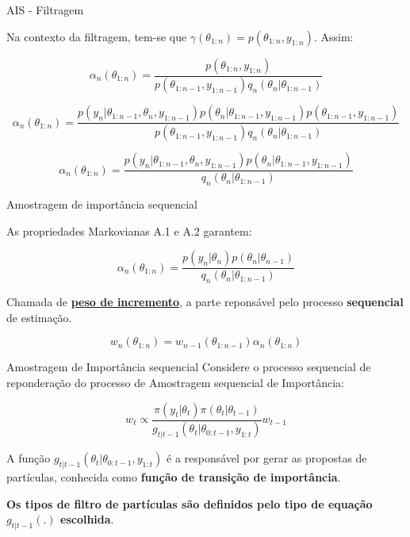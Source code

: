 \documentclass{beamer}
\begin{document}
\begin{frame}{AIS - Filtragem}

Na contexto da filtragem, tem-se que $\gamma(\theta_{1:n}) = p(\theta_{1:n},y_{1:n})$. Assim:

$$
\alpha_n(\theta_{1:n}) = \frac{p(\theta_{1:n},y_{1:n})}{p(\theta_{1:n-1},y_{1:n-1})q_n(\theta_n|\theta_{1:n-1})}
$$

\pause

$$
\alpha_n(\theta_{1:n}) = \frac{p(y_{n}|\theta_{1:n-1},\theta_n,y_{1:n-1})p(\theta_{n}|\theta_{1:n-1},y_{1:n-1})p(\theta_{1:n-1},y_{1:n-1})}{p(\theta_{1:n-1},y_{1:n-1})q_n(\theta_n|\theta_{1:n-1})}
$$

\pause

$$
\alpha_n(\theta_{1:n}) = \frac{p(y_{n}|\theta_{1:n-1},\theta_n,y_{1:n-1})p(\theta_{n}|\theta_{1:n-1},y_{1:n-1})}{q_n(\theta_n|\theta_{1:n-1})}
$$
\end{frame}

\begin{frame}{Amostragem de importância sequencial}

As propriedades Markovianas A.1 e A.2 garantem:

$$
\alpha_n(\theta_{1:n}) = \frac{p(y_{n}|\theta_n)p(\theta_{n}|\theta_{n-1})}{q_n(\theta_n|\theta_{1:n-1})}
$$

\pause

Chamada de \underline{\textbf{peso de incremento}}, a parte reponsável pelo processo \textbf{sequencial} de estimação.


$$
w_n(\theta_{1:n}) = w_{n-1}(\theta_{1:n-1}) \alpha_n(\theta_{1:n})
$$


\end{frame}

\begin{frame}{Amostragem de Importância sequencial}
Considere o processo sequencial de reponderação do processo de Amostragem sequencial de Importância:

$$
w_t \propto \frac{\pi(y_t|\theta_t)\pi(\theta_t|\theta_{t-1})}{g_{t|t-1}(\theta_t|\theta_{0:t-1},y_{1:t})} w_{t-1}
$$

\pause

A função $g_{t|t-1}(\theta_t|\theta_{0:t-1},y_{1:t})$ é a responsável por gerar as propostas de partículas, conhecida como \textbf{função de transição de importância}.

\vspace{0.5cm} 

\pause

\textbf{Os tipos de filtro de partículas são definidos pelo tipo de equação $g_{t|t-1}(.)$ escolhida}.

\end{frame}
\end{document}
